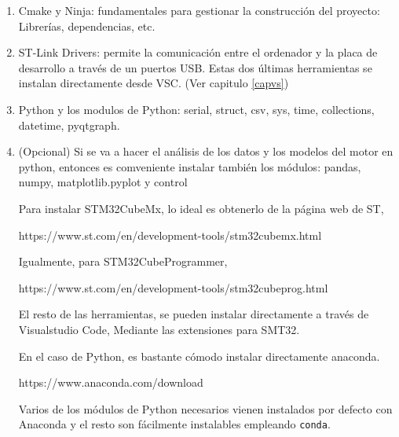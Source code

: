\documentclass[10pt,a4paper]{report}
\begin{document}
\begin{enumerate}
\begin{itemize}
	\item GNU C/C++ for Arm® toolchain tales como arm-none-abi-gcc(compilador), arm-none-abi-nm (symbol viewer) y otros.
	\item GDB debugger cliente y servidor (Depurador). Depurar el programa ejecutándolo en la propia placa
	\item STM32CubeProgrammer (STM32CubeProg) utility (Programador) Descargar el ejecutable desde el ordenador a la placa.
	\item System view descriptor files (.SVD) for the entire STM32 MCU portfolio.
    \item Map file associating STM32 MCUs and MCU development boards to the appropriate SVD 
\end{itemize}

	\item Cmake y Ninja: fundamentales para gestionar la construcción del proyecto: Librerías, dependencias, etc.
	
	\item ST-Link Drivers: permite la comunicación entre el ordenador y la placa de desarrollo a través de un puertos USB. Estas dos últimas herramientas se instalan directamente desde VSC. (Ver capitulo \ref{capvs})
	\item Python y los modulos de Python: serial, struct, csv, sys, time, collections, datetime, pyqtgraph.
	\item (Opcional) Si se va a hacer el análisis de los datos y los modelos del motor en python, entonces es comveniente instalar también los módulos: pandas, numpy, matplotlib.pyplot y control
	
Para instalar STM32CubeMx, lo ideal es obtenerlo de la página web de ST,

\noindent https://www.st.com/en/development-tools/stm32cubemx.html

Igualmente, para STM32CubeProgrammer,

\noindent
https://www.st.com/en/development-tools/stm32cubeprog.html

El resto de las herramientas, se pueden instalar directamente a través de Visualstudio Code, Mediante las extensiones para SMT32.

En el caso de Python, es bastante cómodo instalar directamente anaconda.

https://www.anaconda.com/download

Varios de los módulos de Python necesarios vienen instalados por defecto con Anaconda y el resto son fácilmente instalables empleando \texttt{conda}.
 
\end{enumerate}
\end{document}
